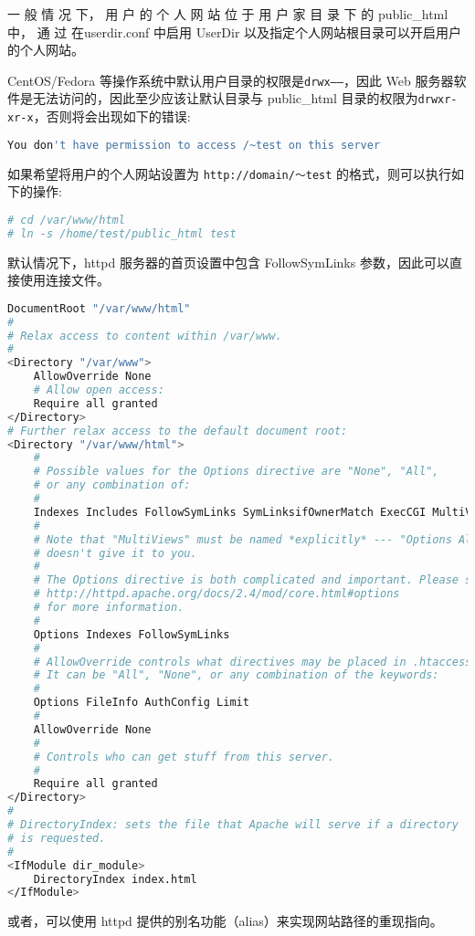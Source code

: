 一 般 情 况 下， 用 户 的 个 人 网 站 位 于 用 户 家 目 录 下 的 public\_html 中， 通 过 在userdir.conf 中启用 UserDir 以及指定个人网站根目录可以开启用户的个人网站。

CentOS/Fedora 等操作系统中默认用户目录的权限是\texttt{drwx------}，因此 Web 服务器软件是无法访问的，因此至少应该让默认目录与 public\_html 目录的权限为\texttt{drwxr-xr-x}，否则将会出现如下的错误:


\begin{lstlisting}[language=bash]
You don't have permission to access /~test on this server
\end{lstlisting}


如果希望将用户的个人网站设置为 \texttt{http://domain/～test} 的格式，则可以执行如下的操作:

\begin{lstlisting}[language=bash]
# cd /var/www/html
# ln -s /home/test/public_html test
\end{lstlisting}


默认情况下，httpd 服务器的首页设置中包含 FollowSymLinks 参数，因此可以直接使用连接文件。


\begin{lstlisting}[language=bash]
DocumentRoot "/var/www/html"
#
# Relax access to content within /var/www.
#
<Directory "/var/www">
	AllowOverride None
	# Allow open access:
	Require all granted
</Directory>
# Further relax access to the default document root:
<Directory "/var/www/html">
	#
	# Possible values for the Options directive are "None", "All",
	# or any combination of:
	#
	Indexes Includes FollowSymLinks SymLinksifOwnerMatch ExecCGI MultiViews
	#
	# Note that "MultiViews" must be named *explicitly* --- "Options All"
	# doesn't give it to you.
	#
	# The Options directive is both complicated and important. Please see
	# http://httpd.apache.org/docs/2.4/mod/core.html#options
	# for more information.
	#
	Options Indexes FollowSymLinks
	#
	# AllowOverride controls what directives may be placed in .htaccess files.
	# It can be "All", "None", or any combination of the keywords:
	#
	Options FileInfo AuthConfig Limit
	#
	AllowOverride None
	#
	# Controls who can get stuff from this server.
	#
	Require all granted
</Directory>
#
# DirectoryIndex: sets the file that Apache will serve if a directory
# is requested.
#
<IfModule dir_module>
	DirectoryIndex index.html
</IfModule>
\end{lstlisting}

或者，可以使用 httpd 提供的别名功能（alias）来实现网站路径的重现指向。

